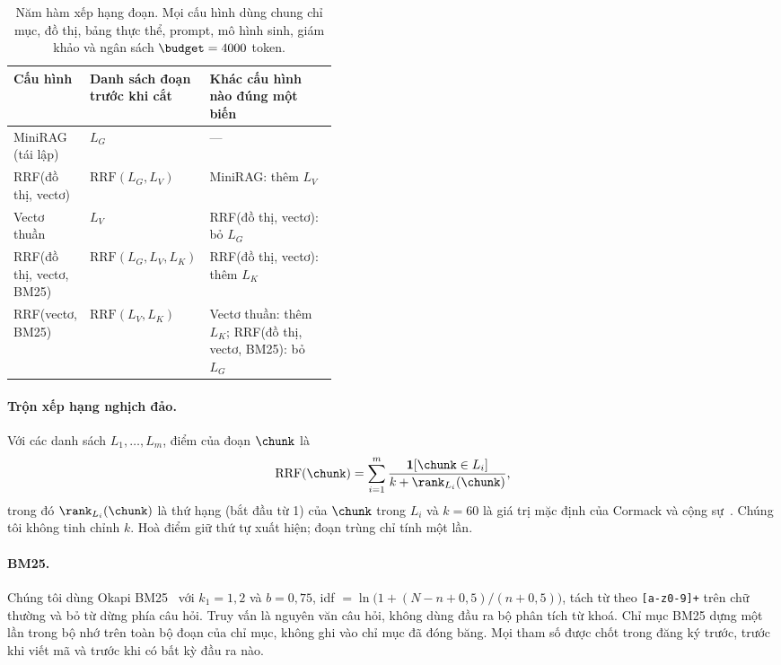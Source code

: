 \begin{table}[t]\centering
\caption{Năm hàm xếp hạng đoạn. Mọi cấu hình dùng chung chỉ mục, đồ thị, bảng thực thể, prompt, mô hình sinh, giám khảo và ngân sách $\budget=4000$ token.}
\label{tab:variants}
\small
\begin{tabular}{llp{0.42\linewidth}}
\toprule
Cấu hình & Danh sách đoạn trước khi cắt & Khác cấu hình nào đúng một biến \\
\midrule
MiniRAG (tái lập) & $L_G$ & --- \\
RRF(đồ thị, vectơ) & $\mathrm{RRF}(L_G, L_V)$ & MiniRAG: thêm $L_V$ \\
Vectơ thuần & $L_V$ & RRF(đồ thị, vectơ): bỏ $L_G$ \\
RRF(đồ thị, vectơ, BM25) & $\mathrm{RRF}(L_G, L_V, L_K)$ & RRF(đồ thị, vectơ): thêm $L_K$ \\
RRF(vectơ, BM25) & $\mathrm{RRF}(L_V, L_K)$ & Vectơ thuần: thêm $L_K$; RRF(đồ thị, vectơ, BM25): bỏ $L_G$ \\
\bottomrule
\end{tabular}
\end{table}

\paragraph{Trộn xếp hạng nghịch đảo.}
Với các danh sách $L_1,\dots,L_m$, điểm của đoạn $\chunk$ là
\begin{equation}\label{eq:rrf}
  \mathrm{RRF}(\chunk) = \sum_{i=1}^{m} \frac{\mathbf{1}[\chunk \in L_i]}{k + \rank_{L_i}(\chunk)},
\end{equation}
trong đó $\rank_{L_i}(\chunk)$ là thứ hạng (bắt đầu từ 1) của $\chunk$ trong $L_i$ và $k=60$ là giá trị mặc định của Cormack và cộng sự~\cite{cormack2009rrf}.
Chúng tôi không tinh chỉnh $k$. Hoà điểm giữ thứ tự xuất hiện; đoạn trùng chỉ tính một lần.

\paragraph{BM25.}
Chúng tôi dùng Okapi BM25~\cite{robertson2009bm25} với $k_1 = 1{,}2$ và $b = 0{,}75$, idf $= \ln\bigl(1 + (N - n + 0{,}5)/(n + 0{,}5)\bigr)$, tách từ theo \texttt{[a-z0-9]+} trên chữ thường và bỏ từ dừng phía câu hỏi.
Truy vấn là nguyên văn câu hỏi, không dùng đầu ra bộ phân tích từ khoá. Chỉ mục BM25 dựng một lần trong bộ nhớ trên toàn bộ đoạn của chỉ mục, không ghi vào chỉ mục đã đóng băng.
Mọi tham số được chốt trong đăng ký trước, trước khi viết mã và trước khi có bất kỳ đầu ra nào.

